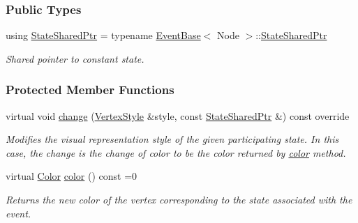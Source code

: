 \subsubsection*{Public Types}
\begin{DoxyCompactItemize}
\item 
using \hyperlink{structevent_1_1VertexColor_a46c13ba3cf027a0b6fd51afd1dec41ae}{State\+Shared\+Ptr} = typename \hyperlink{structEventBase}{Event\+Base}$<$ Node $>$\+::\hyperlink{structevent_1_1UniformChange_a8f41f1a24c711875b55419d9f0eb6bd2}{State\+Shared\+Ptr}\hypertarget{structevent_1_1VertexColor_a46c13ba3cf027a0b6fd51afd1dec41ae}{}\label{structevent_1_1VertexColor_a46c13ba3cf027a0b6fd51afd1dec41ae}

\begin{DoxyCompactList}\small\item\em Shared pointer to constant state. \end{DoxyCompactList}\end{DoxyCompactItemize}
\subsubsection*{Protected Member Functions}
\begin{DoxyCompactItemize}
\item 
virtual void \hyperlink{structevent_1_1VertexColor_a795c7294fa2dc2e73070856e8bcbcb8f}{change} (\hyperlink{structVertexStyle}{Vertex\+Style} \&style, const \hyperlink{structevent_1_1UniformChange_a8f41f1a24c711875b55419d9f0eb6bd2}{State\+Shared\+Ptr} \&) const override\hypertarget{structevent_1_1VertexColor_a795c7294fa2dc2e73070856e8bcbcb8f}{}\label{structevent_1_1VertexColor_a795c7294fa2dc2e73070856e8bcbcb8f}

\begin{DoxyCompactList}\small\item\em Modifies the visual representation style of the given participating state. In this case, the change is the change of color to be the color returned by \hyperlink{structevent_1_1VertexColor_a53d03de850ea2b28701333c5e70d9f20}{color} method. \end{DoxyCompactList}\item 
virtual \hyperlink{colors_8h_ab87bacfdad76e61b9412d7124be44c1c}{Color} \hyperlink{structevent_1_1VertexColor_a53d03de850ea2b28701333c5e70d9f20}{color} () const =0
\begin{DoxyCompactList}\small\item\em Returns the new color of the vertex corresponding to the state associated with the event. \end{DoxyCompactList}\end{DoxyCompactItemize}
